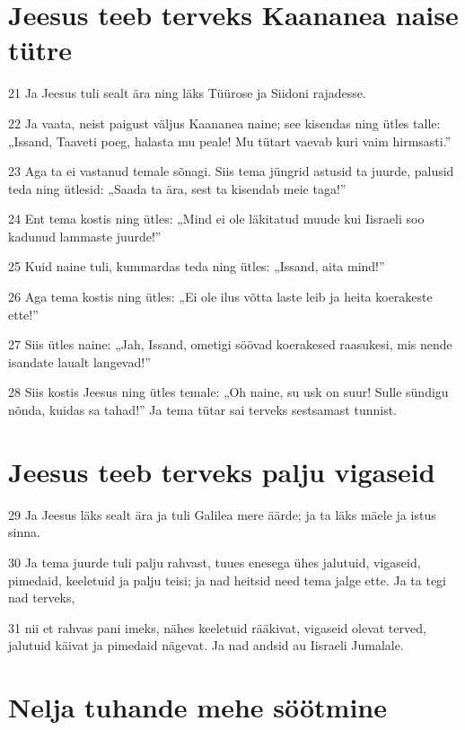 \section*{Jeesus teeb terveks Kaananea naise tütre}

\par 21 Ja Jeesus tuli sealt ära ning läks Tüürose ja Siidoni rajadesse.
\par 22 Ja vaata, neist paigust väljus Kaananea naine; see kisendas ning ütles talle: „Issand, Taaveti poeg, halasta mu peale! Mu tütart vaevab kuri vaim hirmsasti.”
\par 23 Aga ta ei vastanud temale sõnagi. Siis tema jüngrid astusid ta juurde, palusid teda ning ütlesid: „Saada ta ära, sest ta kisendab meie taga!”
\par 24 Ent tema kostis ning ütles: „Mind ei ole läkitatud muude kui Iisraeli soo kadunud lammaste juurde!”
\par 25 Kuid naine tuli, kummardas teda ning ütles: „Issand, aita mind!”
\par 26 Aga tema kostis ning ütles: „Ei ole ilus võtta laste leib ja heita koerakeste ette!”
\par 27 Siis ütles naine: „Jah, Issand, ometigi söövad koerakesed raasukesi, mis nende isandate laualt langevad!”
\par 28 Siis kostis Jeesus ning ütles temale: „Oh naine, su usk on suur! Sulle sündigu nõnda, kuidas sa tahad!” Ja tema tütar sai terveks sestsamast tunnist.

\section*{Jeesus teeb terveks palju vigaseid}

\par 29 Ja Jeesus läks sealt ära ja tuli Galilea mere äärde; ja ta läks mäele ja istus sinna.
\par 30 Ja tema juurde tuli palju rahvast, tuues enesega ühes jalutuid, vigaseid, pimedaid, keeletuid ja palju teisi; ja nad heitsid need tema jalge ette. Ja ta tegi nad terveks,
\par 31 nii et rahvas pani imeks, nähes keeletuid rääkivat, vigaseid olevat terved, jalutuid käivat ja pimedaid nägevat. Ja nad andsid au Iisraeli Jumalale.

\section*{Nelja tuhande mehe söötmine}

